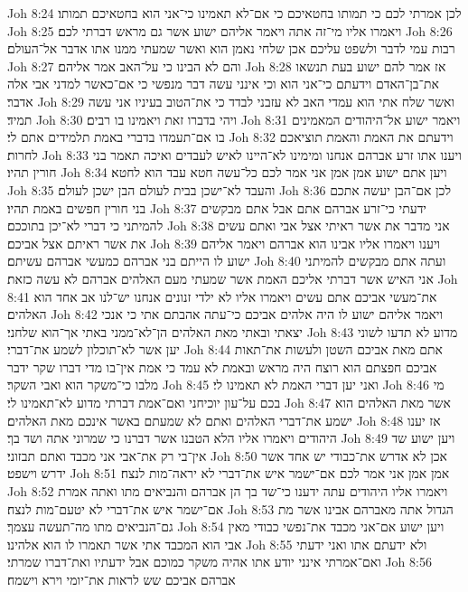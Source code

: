 Joh 8:24  לכן אמרתי לכם כי תמותו בחטאיכם כי אם־לא תאמינו כי־אני הוא בחטאיכם תמותו׃
Joh 8:25  ויאמרו אליו מי־זה אתה ויאמר אליהם ישוע אשר גם מראש דברתי לכם׃
Joh 8:26  רבות עמי לדבר ולשפט עליכם אכן שלחי נאמן הוא ואשר שמעתי ממנו אתו אדבר אל־העולם׃
Joh 8:27  והם לא הבינו כי על־האב אמר אליהם׃
Joh 8:28  אז אמר להם ישוע בעת תנשאו את־בן־האדם וידעתם כי־אני הוא וכי אינני עשה דבר מנפשי כי אם־כאשר למדני אבי אלה אדבר׃
Joh 8:29  ואשר שלח אתי הוא עמדי האב לא עזבני לבדד כי את־הטוב בעיניו אני עשה תמיד׃
Joh 8:30  ויהי בדברו זאת ויאמינו בו רבים׃
Joh 8:31  ויאמר ישוע אל־היהודים המאמינים בו אם־תעמדו בדברי באמת תלמידים אתם לי׃
Joh 8:32  וידעתם את האמת והאמת תוציאכם לחרות׃
Joh 8:33  ויענו אתו זרע אברהם אנחנו ומימינו לא־היינו לאיש לעבדים ואיכה תאמר בני חורין תהיו׃
Joh 8:34  ויען אתם ישוע אמן אמן אני אמר לכם כל־עשה חטא עבד הוא לחטא׃
Joh 8:35  והעבד לא־ישכן בבית לעולם הבן ישכן לעולם׃
Joh 8:36  לכן אם־הבן יעשה אתכם בני חורין חפשים באמת תהיו׃
Joh 8:37  ידעתי כי־זרע אברהם אתם אבל אתם מבקשים להמיתני כי דברי לא־יכן בתוככם׃
Joh 8:38  אני מדבר את אשר ראיתי אצל אבי ואתם עשים את אשר ראיתם אצל אביכם׃
Joh 8:39  ויענו ויאמרו אליו אבינו הוא אברהם ויאמר אליהם ישוע לו הייתם בני אברהם כמעשי אברהם עשיתם׃
Joh 8:40  ועתה אתם מבקשים להמיתני אני האיש אשר דברתי אליכם האמת אשר שמעתי מעם האלהים אברהם לא עשה כזאת׃
Joh 8:41  את־מעשי אביכם אתם עשים ויאמרו אליו לא ילדי זנונים אנחנו יש־לנו אב אחד הוא האלהים׃
Joh 8:42  ויאמר אליהם ישוע לו היה אלהים אביכם כי־עתה אהבתם אתי כי אנכי יצאתי ובאתי מאת האלהים הן־לא־ממני באתי אך־הוא שלחני׃
Joh 8:43  מדוע לא תדעו לשוני יען אשר לא־תוכלון לשמע את־דברי׃
Joh 8:44  אתם מאת אביכם השטן ולעשות את־תאות אביכם חפצתם הוא רוצח היה מראש ובאמת לא עמד כי אמת אין־בו מדי דברו שקר ידבר מלבו כי־משקר הוא ואבי השקר׃
Joh 8:45  ואני יען דברי האמת לא תאמינו לי׃
Joh 8:46  מי בכם על־עון יוכיחני ואם־אמת דברתי מדוע לא־תאמינו לי׃
Joh 8:47  אשר מאת האלהים הוא ישמע את־דברי האלהים ואתם לא שמעתם באשר אינכם מאת האלהים׃
Joh 8:48  אז יענו היהודים ויאמרו אליו הלא הטבנו אשר דברנו כי שמרוני אתה ושד בך׃
Joh 8:49  ויען ישוע שד אין־בי רק את־אבי אני מכבד ואתם תבזוני׃
Joh 8:50  אכן לא אדרש את־כבודי יש אחד אשר ידרש וישפט׃
Joh 8:51  אמן אמן אני אמר לכם אם־ישמר איש את־דברי לא יראה־מות לנצח׃
Joh 8:52  ויאמרו אליו היהודים עתה ידענו כי־שד בך הן אברהם והנביאים מתו ואתה אמרת אם־ישמר איש את־דברי לא יטעם־מות לנצח׃
Joh 8:53  הגדול אתה מאברהם אבינו אשר מת גם־הנביאים מתו מה־תעשה עצמך׃
Joh 8:54  ויען ישוע אם־אני מכבד את־נפשי כבודי מאין אבי הוא המכבד אתי אשר תאמרו לו הוא אלהינו׃
Joh 8:55  ולא ידעתם אתו ואני ידעתי ואם־אמרתי אינני יודע אתו אהיה משקר כמוכם אבל ידעתיו ואת־דברו שמרתי׃
Joh 8:56  אברהם אביכם שש לראות את־יומי וירא וישמח׃
